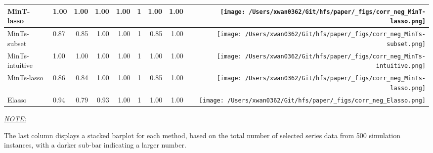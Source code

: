 \documentclass[11pt,a4paper,]{article}
\begin{document}
\begin{table}[!h]
{\begin{threeparttable}
\begin{tabular}{llrrrrrr>{}r}
MinT-lasso & 1.00 & 1.00 & 1.00 & 1.00 & 1 & 1.00 & 1.00 & \texttt{[image: /Users/xwan0362/Git/hfs/paper/\_figs/corr\_neg\_MinT-lasso.png]}\\
\midrule
MinTs-subset & 0.87 & 0.85 & 1.00 & 1.00 & 1 & 0.85 & 1.00 & \texttt{[image: /Users/xwan0362/Git/hfs/paper/\_figs/corr\_neg\_MinTs-subset.png]}\\
MinTs-intuitive & 1.00 & 1.00 & 1.00 & 1.00 & 1 & 1.00 & 1.00 & \texttt{[image: /Users/xwan0362/Git/hfs/paper/\_figs/corr\_neg\_MinTs-intuitive.png]}\\
MinTs-lasso & 0.86 & 0.84 & 1.00 & 1.00 & 1 & 0.85 & 1.00 & \texttt{[image: /Users/xwan0362/Git/hfs/paper/\_figs/corr\_neg\_MinTs-lasso.png]}\\
\midrule
Elasso & 0.94 & 0.79 & 0.93 & 1.00 & 1 & 1.00 & 1.00 & \texttt{[image: /Users/xwan0362/Git/hfs/paper/\_figs/corr\_neg\_Elasso.png]}\\
\bottomrule
\end{tabular}
\begin{tablenotes}[para]
\item \underline{\textit{NOTE:}} 
\item The last column displays a stacked barplot for each method, based on the total number of selected series data from 500 simulation instances, with a darker sub-bar indicating a larger number.
\end{tablenotes}
\end{threeparttable}}
\endgroup{}
\end{table}
\end{document}
